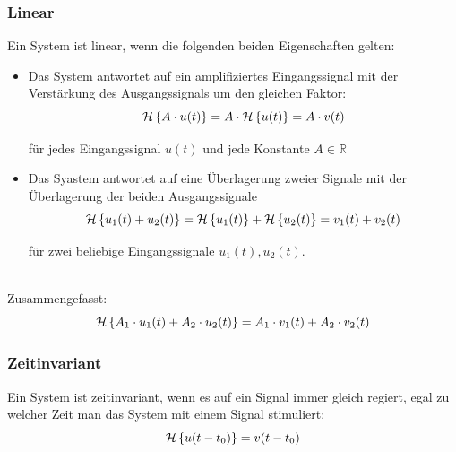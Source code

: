 \subsubsection{Linear}
Ein System ist linear, wenn die folgenden beiden Eigenschaften gelten:
\begin{itemize}
	\item Das System antwortet auf ein amplifiziertes Eingangssignal mit der Verstärkung des Ausgangssignals um den gleichen Faktor:
	\[
		\mathcal{H}\left\lbrace A \cdot u(t)\right\rbrace= A \cdot \mathcal{H}\left\lbrace u(t)\right\rbrace = A \cdot v(t)
	\]
	\begin{footnotesize}
		für jedes Eingangssignal $u(t)$ und jede Konstante $A \in \mathbb{R}$\\
	\end{footnotesize}
	\item Das Syastem antwortet auf eine Überlagerung zweier Signale mit der Überlagerung der beiden Ausgangssignale
	\[
		\mathcal{H}\left\lbrace u_1(t) + u_2(t)\right\rbrace = \mathcal{H}\left\lbrace u_1(t)\right\rbrace + \mathcal{H}\left\lbrace u_2(t)\right\rbrace = v_1(t) + v_2(t)
	\]
	\begin{footnotesize}
		für zwei beliebige Eingangssignale $u_1(t),u_2(t)$.\\\\
	\end{footnotesize}
\end{itemize}
Zusammengefasst:
\[
	\mathcal{H}\left\lbrace A_1 \cdot u_1(t) + A_2 \cdot u_2(t)\right\rbrace = A_1 \cdot v_1(t) + A_2 \cdot v_2(t)
\]

\subsubsection{Zeitinvariant}
Ein System ist zeitinvariant, wenn es auf ein Signal immer gleich regiert, egal zu welcher Zeit man das System mit einem Signal stimuliert:
\[
	\mathcal{H}\left\lbrace u(t-t_0)\right\rbrace = v(t-t_0)
\]